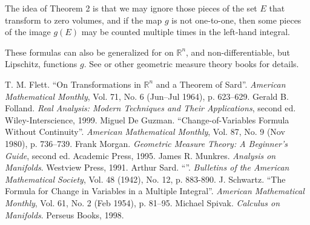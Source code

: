 \documentclass[12pt]{article}
\newcommand{\real}{\mathbb{R}}
\begin{document}
The idea of Theorem 2 is that we may ignore those pieces of the set $E$
that transform to zero volumes, and if the map $g$ is not one-to-one,
then some pieces of the image $g(E)$ may be counted multiple times
in the left-hand integral.

These formulas can also be generalized for 
 on $\real^n$,
and non-differentiable, but Lipschitz, functions $g$.  See \cite{Morgan}
or other geometric measure theory books for details.

\begin{thebibliography}{3}
T. M. Flett. ``On Transformations in $\real^n$ and a Theorem of Sard''.
\emph{American Mathematical Monthly}, Vol. 71, No. 6 (Jun--Jul 1964), 
p. 623--629.
Gerald B. Folland. 
\emph{Real Analysis: Modern Techniques and Their Applications}, 
second ed. Wiley-Interscience, 1999.
Miguel De Guzman. ``Change-of-Variables Formula Without Continuity''.
\emph{American Mathematical Monthly}, Vol. 87, No. 9 (Nov 1980), p. 736--739.
Frank Morgan. \emph{Geometric Measure Theory: A Beginner's Guide}, second ed. 
Academic Press, 1995.
James R. Munkres. \emph{Analysis on Manifolds}. Westview Press, 1991.
Arthur Sard. ``''.
\emph{Bulletins of the American Mathematical Society}, Vol. 48 (1942), No. 12, p. 883-890.
J. Schwartz. ``The Formula for Change in Variables in a Multiple Integral''.
\emph{American Mathematical Monthly}, Vol. 61, No. 2 (Feb 1954), p. 81--95.
Michael Spivak. \emph{Calculus on Manifolds}. Perseus Books, 1998.
\end{thebibliography}

\end{document}
